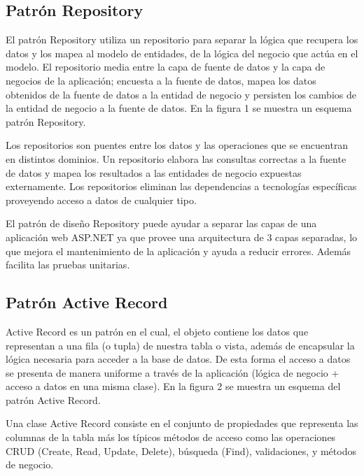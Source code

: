 \documentclass[preprint,12pt]{elsarticle}
\begin{document}



\subsection{Patrón Repository}

El patrón Repository utiliza un repositorio para separar la lógica que recupera los datos y los mapea al modelo de entidades, de la lógica del negocio que actúa en el modelo. El repositorio media entre la capa de fuente de datos y la capa de negocios de la aplicación; encuesta a la fuente de datos, mapea los datos obtenidos de la fuente de datos a la entidad de negocio y persisten los cambios de la entidad de negocio a la fuente de datos. En la figura 1 se muestra un esquema patrón Repository.

Los repositorios son puentes entre los datos y las operaciones que se encuentran en distintos dominios. Un repositorio elabora las consultas correctas a la fuente de datos y mapea los resultados a las entidades de negocio expuestas externamente. Los repositorios eliminan las dependencias a tecnologías específicas proveyendo acceso a datos de cualquier tipo.

El patrón de diseño Repository puede ayudar a separar las capas de una aplicación web ASP.NET ya que provee una arquitectura de 3 capas separadas, lo que mejora el mantenimiento de la aplicación y ayuda a reducir errores. Además facilita las pruebas unitarias.\cite{referenciaQuispe1}

\subsection{Patrón Active Record}
Active Record es un patrón en el cual, el objeto contiene los datos que representan a una fila (o tupla) de nuestra tabla o vista, además de encapsular la lógica necesaria para acceder a la base de datos. De esta forma el acceso a datos se presenta de manera uniforme a través de la aplicación (lógica de negocio + acceso a datos en una misma clase). En la figura 2 se muestra un esquema del patrón Active Record.

Una clase Active Record consiste en el conjunto de propiedades que representa las columnas de la tabla más los típicos métodos de acceso como las operaciones CRUD (Create, Read, Update, Delete), búsqueda (Find), validaciones, y métodos de negocio.
\end{document}

